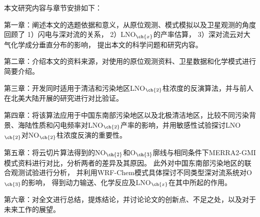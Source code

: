 本文研究内容与章节安排如下：

第一章：阐述本文的选题依据和意义，从原位观测、模式模拟以及卫星观测的角度回顾了
1）闪电与深对流的关系，
2）LNO$_{\ch{x}}$的产率估算，
3）深对流云对大气化学成分垂直分布的影响，
提出本文的科学问题和研究内容。

第二章：介绍本文的资料来源，对使用的原位观测资料、卫星数据和化学模式进行简要介绍。

第三章：开发同时适用于清洁和污染地区LNO$_{\ch{2}}$柱浓度的反演算法，并与前人在北美大陆开展的研究进行对比验证。

第四章：将该算法应用于中国东南部污染地区以及北极清洁地区，比较不同污染背景、海陆性质和闪电频率对LNO$_{\ch{2}}$产率的影响，并用敏感性试验探讨LNO$_{\ch{2}}$对NO$_{\ch{2}}$柱浓度反演的重要性。

第五章：将云切片算法得到的NO$_{\ch{2}}$和O$_{\ch{3}}$廓线与相同条件下MERRA2-GMI模式资料进行对比，分析两者的差异及其原因。
此外对中国东南部污染地区的联合观测试验进行分析，
并利用WRF-Chem模式具体探讨不同类型深对流系统对O$_{\ch{3}}$的影响，
得到动力输送、化学反应及LNO$_{\ch{x}}$在其中所起的作用。

第六章：对全文进行总结，提炼结论，并讨论论文的创新点、不足之处，以及对于未来工作的展望。
